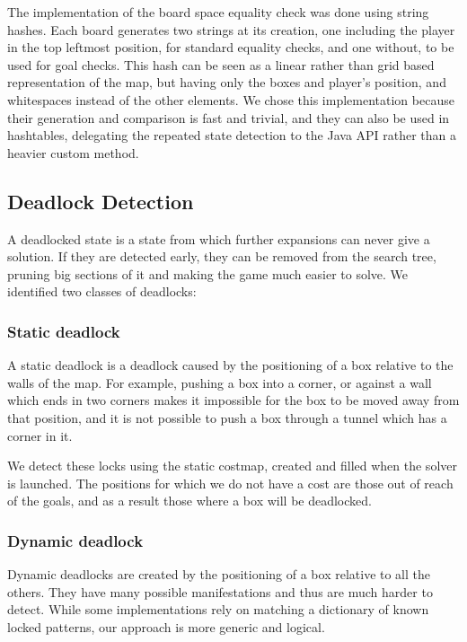 \documentclass[a4paper,11pt]{article}
\begin{document}
The implementation of the board space equality check was done using string
hashes. Each board generates two strings at its creation, one including the
player in the top leftmost position, for standard equality checks, and one
without, to be used for goal checks. This hash can be seen as a linear rather
than grid based representation of the map, but having only the boxes and
player's position, and whitespaces instead of the other elements. We chose this
implementation because their generation and comparison is fast and trivial, and
they can also be used in hashtables, delegating the repeated state detection to
the Java API rather than a heavier custom method.

\subsection{Deadlock Detection}

A deadlocked state is a state from which further expansions can never give a
solution. If they are detected early, they can be removed from the search tree,
pruning big sections of it and making the game much easier to solve. We 
identified two classes of deadlocks:

\subsubsection{Static deadlock}

A static deadlock is a deadlock caused by the positioning of a box relative to
the walls of the map. For example, pushing a box into a corner, or against a
wall which ends in two corners makes it impossible for the box to be moved away
from that position, and it is not possible to push a box through a tunnel which
has a corner in it.

We detect these locks using the static costmap, created and filled when the
solver is launched. The positions for which we do not have a cost are those out
of reach of the goals, and as a result those where a box will be deadlocked.

\subsubsection{Dynamic deadlock}

Dynamic deadlocks are created by the positioning of a box relative to all the
others. They have many possible manifestations and thus are much harder to
detect. While some implementations rely on matching a dictionary of known locked
patterns, our approach is more generic and logical.
\end{document}
